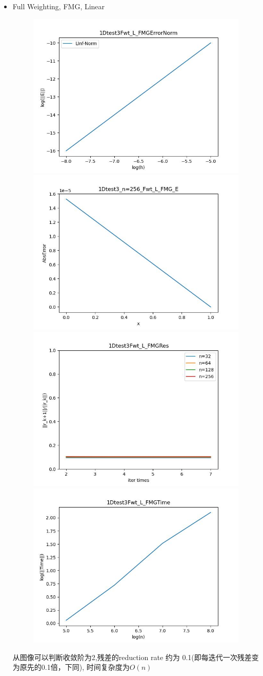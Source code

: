\documentclass{article}
\begin{document}
\begin{itemize}
    \item Full Weighting, FMG, Linear
    \begin{figure}[h]
        \centering
        \includegraphics[width=0.35\linewidth]{1Dtest3Fwt_L_FMGErrorNorm.jpg}
        \includegraphics[width=0.35\linewidth]{1Dtest3_n=256_Fwt_L_FMG_E.jpg}
        \includegraphics[width=0.35\linewidth]{1Dtest3Fwt_L_FMGRes.jpg}
        \includegraphics[width=0.35\linewidth]{1Dtest3Fwt_L_FMGTime.jpg}
    \end{figure}
    
    从图像可以判断收敛阶为2,残差的reduction rate 约为 0.1(即每迭代一次残差变为原先的0.1倍，下同), 时间复杂度为$O(n)$


\end{itemize}
\end{document}
